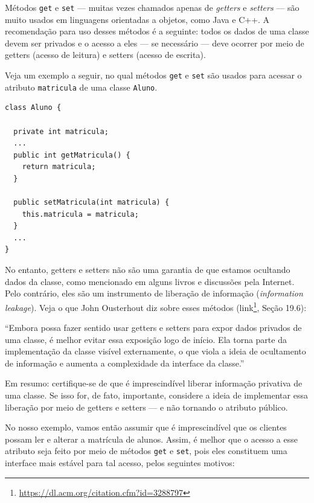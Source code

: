\documentclass[
  11pt,
  twoside]{book}
\newcommand{\passthrough}[1]{#1}
\DeclareRobustCommand{\href}[2]{#2\footnote{\url{#1}}}
\renewenvironment{quote}{\centering \vspace{1.5ex} \begin{tcolorbox}[colback=backcolor, width=4.9in]}{\end{tcolorbox}}
\begin{document}
 

Métodos \passthrough{\lstinline!get!} e \passthrough{\lstinline!set!}
--- muitas vezes chamados apenas de \emph{getters} e \emph{setters} ---
são muito usados em linguagens orientadas a objetos, como Java e C++. A
recomendação para uso desses métodos é a seguinte: todos os dados de uma
classe devem ser privados e o acesso a eles --- se necessário --- deve
ocorrer por meio de getters (acesso de leitura) e setters (acesso de
escrita).

Veja um exemplo a seguir, no qual métodos \passthrough{\lstinline!get!}
e \passthrough{\lstinline!set!} são usados para acessar o atributo
\passthrough{\lstinline!matricula!} de uma classe
\passthrough{\lstinline!Aluno!}.

\begin{lstlisting}
class Aluno {

  private int matricula;
  ...
  public int getMatricula() {
    return matricula;
  }

  public setMatricula(int matricula) {
    this.matricula = matricula;  
  }
  ...
}
\end{lstlisting}

 No entanto, getters e setters não são uma
garantia de que estamos ocultando dados da classe, como mencionado em
alguns livros e discussões pela Internet. Pelo contrário, eles são um
instrumento de liberação de informação (\emph{information leakage}).
Veja o que John Ousterhout diz sobre esses métodos
(\href{https://dl.acm.org/citation.cfm?id=3288797}{link}, Seção 19.6):

\begin{quote}
``Embora possa fazer sentido usar getters e setters para expor dados
privados de uma classe, é melhor evitar essa exposição logo de início.
Ela torna parte da implementação da classe visível externamente, o que
viola a ideia de ocultamento de informação e aumenta a complexidade da
interface da classe.''
\end{quote}

Em resumo: certifique-se de que é imprescindível liberar informação
privativa de uma classe. Se isso for, de fato, importante, considere a
ideia de implementar essa liberação por meio de getters e setters --- e
não tornando o atributo público.

No nosso exemplo, vamos então assumir que é imprescindível que os
clientes possam ler e alterar a matrícula de alunos. Assim, é melhor que
o acesso a esse atributo seja feito por meio de métodos
\passthrough{\lstinline!get!} e \passthrough{\lstinline!set!}, pois eles
constituem uma interface mais estável para tal acesso, pelos seguintes
motivos:
\end{document}
